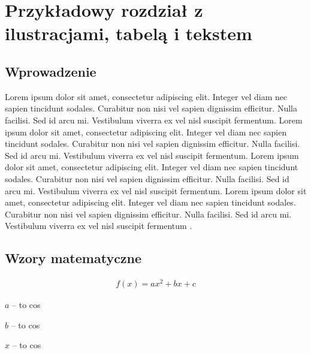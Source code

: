 \chapter{Przykładowy rozdział z ilustracjami, tabelą i tekstem}

\section{Wprowadzenie}

Lorem ipsum dolor sit amet, consectetur adipiscing elit. Integer vel diam nec sapien tincidunt sodales. Curabitur non nisi vel sapien dignissim efficitur. Nulla facilisi. Sed id arcu mi. Vestibulum viverra ex vel nisl suscipit fermentum. Lorem ipsum dolor sit amet, consectetur adipiscing elit. Integer vel diam nec sapien tincidunt sodales. Curabitur non nisi vel sapien dignissim efficitur. Nulla facilisi. Sed id arcu mi. Vestibulum viverra ex vel nisl suscipit fermentum. Lorem ipsum dolor sit amet, consectetur adipiscing elit. Integer vel diam nec sapien tincidunt sodales. Curabitur non nisi vel sapien dignissim efficitur. Nulla facilisi. Sed id arcu mi. Vestibulum viverra ex vel nisl suscipit fermentum. Lorem ipsum dolor sit amet, consectetur adipiscing elit. Integer vel diam nec sapien tincidunt sodales. Curabitur non nisi vel sapien dignissim efficitur. Nulla facilisi. Sed id arcu mi. Vestibulum viverra ex vel nisl suscipit fermentum \parencite{PortalAI_CzymJestSI}.

\section{Wzory matematyczne}

\begin{align}
    f(x) = ax^2 + bx + c
    \label{eq:funkcja_kwadratowa} %
\end{align}

\begin{gdzie}
    \item $a$ -- to cos 
    \item $b$ -- to cos 
    \item $x$ -- to cos 
\end{gdzie}


